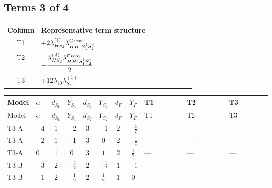 \documentclass[8pt]{article}
\begin{document}
\begin{landscape}
\subsection*{Terms 3 of 4}
\begin{center}
\begin{tabular}{@{}c >{\raggedright\arraybackslash}p{0.82\linewidth}@{}}
\toprule
Column & Representative term structure \\
\midrule
T1 & \(\displaystyle +2 {\lambda_{HS_2}^{(1)}} {\lambda_{H H^\dagger S_1^\dagger S_2^\dagger}^{\rm Cross}}\) \\
\midrule
T2 & \(\displaystyle -\frac{{\lambda_{HS_2}^{(A)}} {\lambda_{H H^\dagger S_1^\dagger S_2^\dagger}^{\rm Cross}}}{2}\) \\
\midrule
T3 & \(\displaystyle +12 {\lambda_{10}} {\lambda_{S_2}^{(1)}}\) \\
\midrule
\bottomrule
\end{tabular}
\end{center}
\smallskip
\tiny
\begin{longtable}{@{}llcccccc >{\raggedright\arraybackslash}p{0.21\linewidth} >{\raggedright\arraybackslash}p{0.21\linewidth} >{\raggedright\arraybackslash}p{0.21\linewidth}@{}}
\toprule
Model & $\alpha$ & $d_{S_1}$ & $Y_{S_1}$ & $d_{S_2}$ & $Y_{S_2}$ & $d_F$ & $Y_F$ & T1 & T2 & T3 \\
\midrule
\endfirsthead
\toprule
Model & $\alpha$ & $d_{S_1}$ & $Y_{S_1}$ & $d_{S_2}$ & $Y_{S_2}$ & $d_F$ & $Y_F$ & T1 & T2 & T3 \\
\midrule
\endhead
T3-A & $-4$ & $1$ & $-2$ & $3$ & $-1$ & $2$ & $-\frac{3}{2}$ & --- & --- & --- \\
\midrule
T3-A & $-2$ & $1$ & $-1$ & $3$ & $0$ & $2$ & $-\frac{1}{2}$ & --- & --- & --- \\
\midrule
T3-A & $0$ & $1$ & $0$ & $3$ & $1$ & $2$ & $\frac{1}{2}$ & --- & --- & --- \\
\midrule
T3-B & $-3$ & $2$ & $-\frac{3}{2}$ & $2$ & $-\frac{1}{2}$ & $1$ & $-1$ & --- & --- & --- \\
\midrule
T3-B & $-1$ & $2$ & $-\frac{1}{2}$ & $2$ & $\frac{1}{2}$ & $1$ & $0$ & \scriptsize\adjustbox{max width=\linewidth}{$\begin{gathered} +2 {\lambda_{HS_2}^{(1)}} {\lambda_{H H^\dagger S_1^\dagger S_2^\dagger}^{\rm Cross}}\end{gathered}$} & \scriptsize\adjustbox{max width=\linewidth}{$\begin{gathered} -\frac{{\lambda_{HS_2}^{(A)}} {\lambda_{H H^\dagger S_1^\dagger S_2^\dagger}^{\rm Cross}}}{2}\end{gathered}$} & \scriptsize\adjustbox{max width=\linewidth}{$\begin{gathered} +12 {\lambda_{10}} {\lambda_{S_2}^{(1)}}\end{gathered}$} \\

\end{longtable}
\end{landscape}
\end{document}
